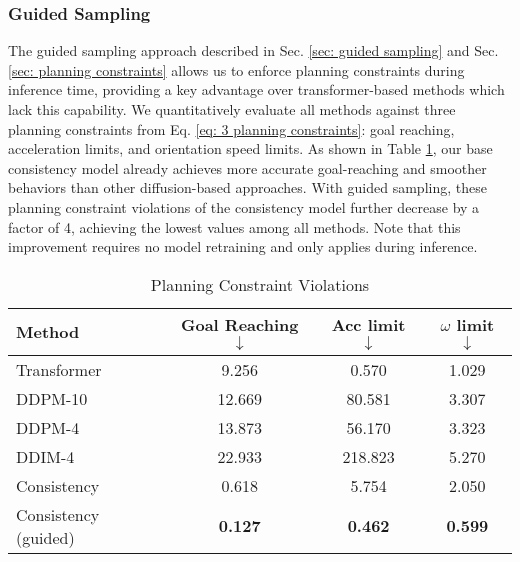 


\subsubsection{\textbf{Guided Sampling}}

The guided sampling approach described in Sec. \ref{sec: guided sampling} and Sec. \ref{sec: planning constraints} allows us to enforce planning constraints during inference time, providing a key advantage over transformer-based methods which lack this capability.
We quantitatively evaluate all methods against three planning constraints from Eq. \eqref{eq: 3 planning constraints}: goal reaching, acceleration limits, and orientation speed limits.
As shown in Table \ref{tab:planning constraints}, our base consistency model already achieves more accurate goal-reaching and smoother behaviors
than other diffusion-based approaches.
With guided sampling, these planning constraint violations of the consistency model further decrease by a factor of 4, achieving the lowest values among all methods.
Note that this improvement requires no model retraining and only applies during inference.

\begin{table}[t]
    \centering
    \caption{Planning Constraint Violations}
    \label{tab:planning constraints}
    \begin{tabular}{lccc}
    \toprule
    Method & Goal Reaching $\downarrow$ & Acc limit $\downarrow$ & $\omega$ limit $\downarrow$ \\
    \midrule
    Transformer & 9.256 & 0.570 & 1.029 \\
    \midrule
    DDPM-10 & 12.669 & 80.581 & 3.307 \\
    DDPM-4 & 13.873 & 56.170 & 3.323 \\
    DDIM-4 & 22.933 & 218.823 & 5.270 \\
    Consistency & 0.618 & 5.754 & 2.050 \\
    Consistency (guided) & \textbf{0.127}  & \textbf{0.462} & \textbf{0.599} \\
    \bottomrule
    \end{tabular}
\end{table}


